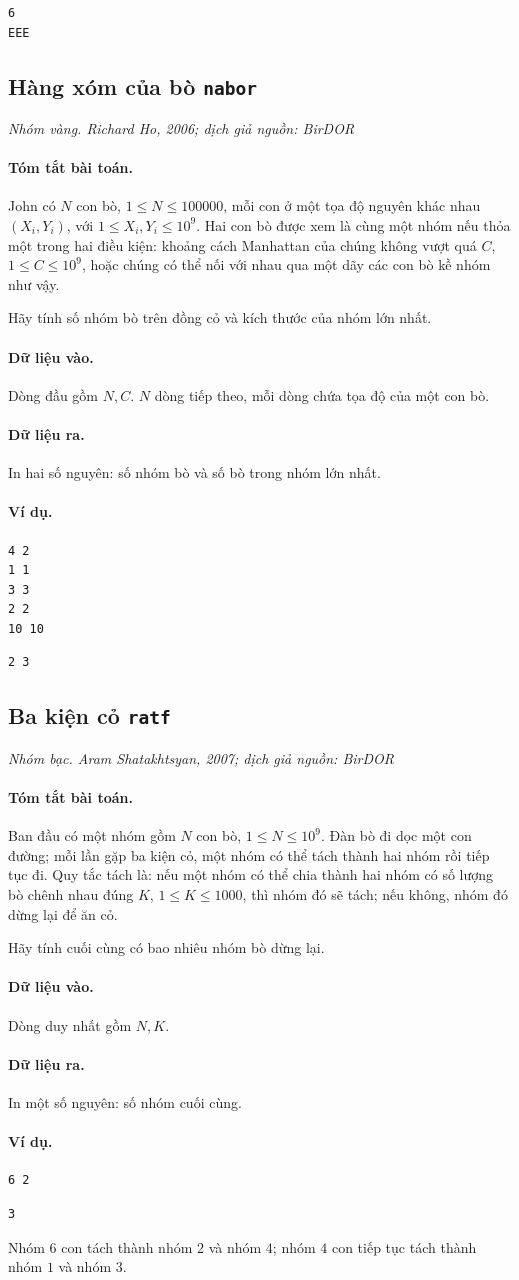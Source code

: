 \documentclass[11pt]{article}
\newcommand{\problem}[4]{%
  \subsection[#1 (#2)]{#1 \hfill {\normalsize\texttt{#2}}}%
  \noindent\textit{#3. #4}\par\smallskip
}
\newcommand{\iosec}[1]{\paragraph{#1}}
\begin{document}
\begin{verbatim}
6
EEE
\end{verbatim}

\problem{Hàng xóm của bò}{nabor}{Nhóm vàng}{Richard Ho, 2006; dịch giả nguồn: BirDOR}

\iosec{Tóm tắt bài toán.}
John có \(N\) con bò, \(1\le N\le 100000\), mỗi con ở một tọa độ nguyên
khác nhau \((X_i,Y_i)\), với \(1\le X_i,Y_i\le 10^9\). Hai con bò được xem là
cùng một nhóm nếu thỏa một trong hai điều kiện: khoảng cách Manhattan của
chúng không vượt quá \(C\), \(1\le C\le 10^9\), hoặc chúng có thể nối với
nhau qua một dãy các con bò kề nhóm như vậy.

Hãy tính số nhóm bò trên đồng cỏ và kích thước của nhóm lớn nhất.

\iosec{Dữ liệu vào.}
Dòng đầu gồm \(N,C\). \(N\) dòng tiếp theo, mỗi dòng chứa tọa độ của một con
bò.

\iosec{Dữ liệu ra.}
In hai số nguyên: số nhóm bò và số bò trong nhóm lớn nhất.

\iosec{Ví dụ.}
\begin{verbatim}
4 2
1 1
3 3
2 2
10 10
\end{verbatim}

\begin{verbatim}
2 3
\end{verbatim}

\problem{Ba kiện cỏ}{ratf}{Nhóm bạc}{Aram Shatakhtsyan, 2007; dịch giả nguồn: BirDOR}

\iosec{Tóm tắt bài toán.}
Ban đầu có một nhóm gồm \(N\) con bò, \(1\le N\le 10^9\). Đàn bò đi dọc một
con đường; mỗi lần gặp ba kiện cỏ, một nhóm có thể tách thành hai nhóm rồi
tiếp tục đi. Quy tắc tách là: nếu một nhóm có thể chia thành hai nhóm có số
lượng bò chênh nhau đúng \(K\), \(1\le K\le 1000\), thì nhóm đó sẽ tách; nếu
không, nhóm đó dừng lại để ăn cỏ.

Hãy tính cuối cùng có bao nhiêu nhóm bò dừng lại.

\iosec{Dữ liệu vào.}
Dòng duy nhất gồm \(N,K\).

\iosec{Dữ liệu ra.}
In một số nguyên: số nhóm cuối cùng.

\iosec{Ví dụ.}
\begin{verbatim}
6 2
\end{verbatim}

\begin{verbatim}
3
\end{verbatim}

Nhóm \(6\) con tách thành nhóm \(2\) và nhóm \(4\); nhóm \(4\) con tiếp tục
tách thành nhóm \(1\) và nhóm \(3\).
\end{document}
